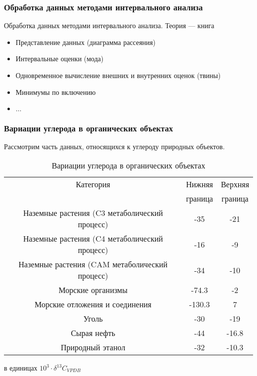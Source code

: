 \begin{frame}
	\frametitle{Обработка данных методами интервального анализа}
Обработка данных методами интервального анализа. Теория --- книга	\cite{BookIntStat}
\begin{itemize}
	\item Представление данных (диаграмма рассеяния)
	\item Интервальные оценки (мода)
	\item Одновременное вычисление внешних и внутренних оценок (твины)
	\item Минимумы по включению
	\item $\ldots$
\end{itemize}
	
\end{frame}


\begin{frame}
	\frametitle{Вариации углерода в органических объектах}
	
Рассмотрим часть данных, относящихся к углероду природных объектов. 

\begin{table}[h!]
	\begin{center}
		{\small
			\begin{tabular}{ccc}
				\hline
				Категория & Нижняя & Верхняя \\
				~ & граница & граница \\ 
				\hline
				Наземные растения (C3 метаболический процесс)	& -35 & -21 \\
				Наземные растения (C4 метаболический процесс)	& -16 & -9 \\
				Наземные растения  (CAM метаболический процесс)	& -34 & -10 \\
				\hline
				Морские организмы 	& -74.3 & -2 \\
				Морские отложения и соединения &	-130.3 & 7 \\
				\hline
				Уголь &	-30 & -19 \\
				Сырая нефть &	-44 & -16.8 \\
				Природный этанол & -32 &  -10.3 \\
				\hline
			\end{tabular}
		}
		\caption{Вариации углерода в органических объектах} в единицах $10^3 \cdot \delta ^{13}C_{VPDB}$
		\label{t:OrganicCarbonVariation}
	\end{center}
\end{table}
	
\end{frame}


